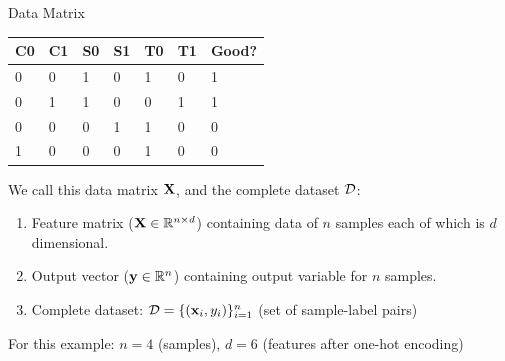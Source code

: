 \documentclass[usenames,dvipsnames]{beamer}
\begin{document}
\begin{frame}{Data Matrix}

	\begin{table}[]
	\begin{tabular}{|l|l||l|l||l|l||l|}
		\hline 
		\rowcolor{white}
		\cellcolor{Lavender}\textbf{C0} & \cellcolor{Lavender}\textbf{C1} & \cellcolor{Lavender}\textbf{S0} & \cellcolor{Lavender}\textbf{S1} & \cellcolor{Lavender}\textbf{T0} & \cellcolor{Lavender}\textbf{T1} & \cellcolor{Tan}\textbf{Good?} \\ \hline 
		\cellcolor{Lavender}0 & \cellcolor{Lavender}0 & \cellcolor{Lavender}1 & \cellcolor{Lavender}0 & \cellcolor{Lavender}1 & \cellcolor{Lavender}0 & \cellcolor{Tan}1 \\
		\cellcolor{Lavender}0 & \cellcolor{Lavender}1 & \cellcolor{Lavender}1 & \cellcolor{Lavender}0 & \cellcolor{Lavender}0 & \cellcolor{Lavender}1 & \cellcolor{Tan}1 \\
		\cellcolor{Lavender}0 & \cellcolor{Lavender}0 & \cellcolor{Lavender}0 & \cellcolor{Lavender}1 & \cellcolor{Lavender}1 & \cellcolor{Lavender}0 & \cellcolor{Tan}0 \\
		\cellcolor{Lavender}1 & \cellcolor{Lavender}0 & \cellcolor{Lavender}0 & \cellcolor{Lavender}0 & \cellcolor{Lavender}1 & \cellcolor{Lavender}0 & \cellcolor{Tan}0 \\ \hline 
	\end{tabular}
\end{table}

\pause We call this data matrix $\mathbf{X}$, and the complete dataset $\mathcal{D}$:
\begin{enumerate}
	\item Feature matrix ($\mathbf{X} \in \mathbb{R}^{n \times d}$) containing data of $n$ samples each of which is $d$ dimensional.
	\item Output vector ($\mathbf{y} \in \mathbb{R}^n$) containing output variable for $n$ samples.
	\item Complete dataset: $\mathcal{D} = \{(\mathbf{x}_i, y_i)\}_{i=1}^n$ (set of sample-label pairs)
\end{enumerate}

\pause For this example: $n = 4$ (samples), $d = 6$ (features after one-hot encoding)

\end{frame}
\end{document}
